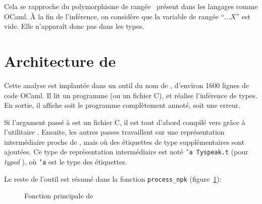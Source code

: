 Cela se rapproche du polymorphisme de rangée~\cite{ocamlObjects} présent dans
les langages comme OCaml. À la fin de l'inférence, on considère que la variable
de rangée \enquote{$…X$} est vide. Elle n'apparaît donc pas dans les types.



\section{Architecture de \ptrtype}
\label{sec:ptrtype-archi}

Cette analyse est implantée dans un outil du nom de \ptrtype{}, d'environ 1600
lignes de code OCaml. Il lit un
programme \newspeak (ou un fichier C), et réalise l'inférence de types. En
sortie, il affiche soit le programme complètement annoté, soit une erreur.

Si l'argument passé à \ptrtype{} est un fichier C, il est tout d'abord compilé
vers \newspeak grâce à l'utilitaire \ctonewspeak. Ensuite, les autres passes
travaillent sur une représentation intermédiaire proche de \newspeak, mais où
des étiquettes de type supplémentaires sont ajoutées. Ce type de représentation
intermédiaire est noté \texttt{'a Tyspeak.t} (pour \emph{typed} \newspeak), où
\texttt{'a} est le type des étiquettes.


Le reste de l'outil est résumé dans la fonction
\texttt{process\_npk} (figure~\ref{fig:implem-process}):

\begin{figure}
\caption{Fonction principale de \ptrtype{}}
\label{fig:implem-process}
\end{figure}

